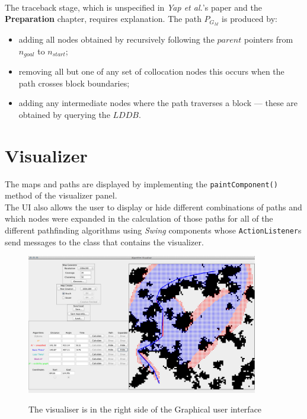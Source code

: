 \documentclass[12pt,notitlepage]{report}
\begin{document}
\\
\noindent
The traceback stage, which is unspecified in {\em Yap et al.}'s paper and the {\bfseries Preparation} chapter, requires explanation. The path $P_{G_{M}}$ is produced by:
\begin{itemize}
\item adding all nodes obtained by recursively following the $parent$ pointers from $n_{goal}$ to $n_{start}$;
\item removing all but one of any set of collocation nodes this occurs when the path crosses block boundaries;
\item adding any intermediate nodes where the path traverses a block --- these are obtained by querying the $LDDB$.
\end{itemize}
 
\section{Visualizer}

The maps and paths are displayed by implementing the {\tt paintComponent()} method of the visualizer panel.\\

\noindent The UI also allows the user to display or hide different combinations of paths and which nodes were expanded in the calculation of those paths for all of the different pathfinding algorithms using {\em Swing} components whose {\tt ActionListener}s send messages to the class that contains the visualizer.

\begin{figure}
\centering
  {\includegraphics[width=0.9\textwidth]{gui.png}}
  \caption[Graphical user interface]{The visualiser is in the right side of the Graphical user interface} 
\end{figure}
\end{document}
